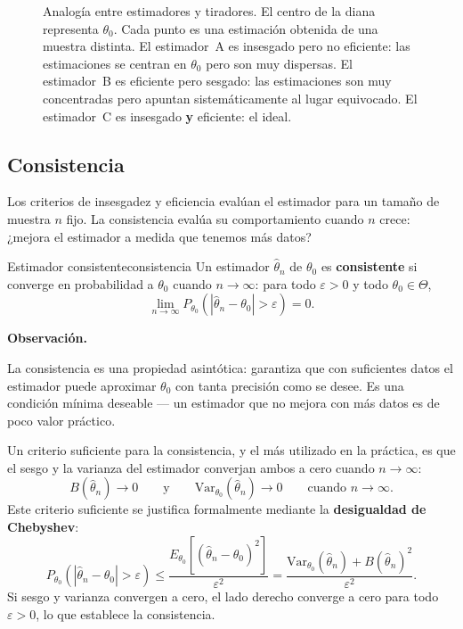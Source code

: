 \documentclass[12pt, a4paper]{book}
\newenvironment{observacion}{%
    \par\medskip\noindent\textbf{\color{azul}Observaci\'{o}n.}\enspace\itshape
}{\par\medskip}
\numberwithin{equation}{chapter}
\begin{document}
\begin{figure}[H]
\begin{tikzpicture}[scale=0.85]
	\end{tikzpicture}
	\caption{Analogía entre estimadores y tiradores. El centro
		de la diana representa $\theta_0$. Cada punto es una
		estimación obtenida de una muestra distinta. El estimador~A
		es insesgado pero no eficiente: las estimaciones se centran
		en $\theta_0$ pero son muy dispersas. El estimador~B es
		eficiente pero sesgado: las estimaciones son muy
		concentradas pero apuntan sistemáticamente al lugar
		equivocado. El estimador~C es insesgado \textbf{y}
		eficiente: el ideal.}
	\label{fig:tiradores}
\end{figure}

\subsection{Consistencia}

Los criterios de insesgadez y eficiencia evalúan el
estimador para un tamaño de muestra $n$ fijo. La
consistencia evalúa su comportamiento cuando $n$ crece:
¿mejora el estimador a medida que tenemos más datos?

\begin{definicion}{Estimador consistente}{consistencia}
	Un estimador $\hat{\theta}_n$ de $\theta_0$ es
	\textbf{consistente} si converge en probabilidad a
	$\theta_0$ cuando $n \to \infty$: para todo
	$\varepsilon > 0$ y todo $\theta_0 \in \Theta$,
	\[
	\lim_{n \to \infty} P_{\theta_0}\!\left(
	|\hat{\theta}_n - \theta_0| > \varepsilon
	\right) = 0.
	\]
\end{definicion}

\begin{observacion}
	La consistencia es una propiedad asintótica: garantiza
	que con suficientes datos el estimador puede aproximar
	$\theta_0$ con tanta precisión como se desee. Es una
	condición mínima deseable --- un estimador que no
	mejora con más datos es de poco valor práctico.
	
	Un criterio suficiente para la consistencia, y el más
	utilizado en la práctica, es que el sesgo y la varianza
	del estimador converjan ambos a cero cuando
	$n \to \infty$:
	\[
	B(\hat{\theta}_n) \to 0
	\qquad \text{y} \qquad
	\mathrm{Var}_{\theta_0}(\hat{\theta}_n) \to 0
	\qquad \text{cuando } n \to \infty.
	\]
	Este criterio suficiente se justifica formalmente
	mediante la \textbf{desigualdad de Chebyshev}:
	\[
	P_{\theta_0}(|\hat{\theta}_n - \theta_0|
	> \varepsilon)
	\leq \frac{E_{\theta_0}[(\hat{\theta}_n -
		\theta_0)^2]}{\varepsilon^2}
	= \frac{\mathrm{Var}_{\theta_0}(\hat{\theta}_n)
		+ B(\hat{\theta}_n)^2}{\varepsilon^2}.
	\]
	Si sesgo y varianza convergen a cero, el lado derecho
	converge a cero para todo $\varepsilon > 0$, lo que
	establece la consistencia.
\end{observacion}
\end{document}
